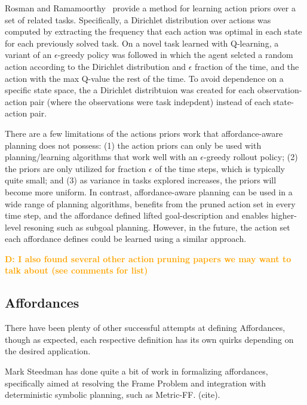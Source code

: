 \documentclass[]{article}
\newcommand{\dnote}[1]{\textcolor{Orange}{\textbf{D: #1}}}
\begin{document}
Rosman and Ramamoorthy~\cite{rosman2012good} provide a method for learning action priors over a set of related tasks. Specifically, a Dirichlet distribution over actions was computed by extracting the frequency that each action was optimal in each state for each previously solved task. On a novel task learned with Q-learning, a variant of an $\epsilon$-greedy policy was followed in which the agent selcted a random action according to the Dirichlet distribution and $\epsilon$ fraction of the time, and the action with the max Q-value the rest of the time. To avoid dependence on a specific state space, the a Dirichlet distribtuion was created for each observation-action pair (where the observations were task indepdent) instead of each state-action pair.

There are a few limitations of the actions priors work that affordance-aware planning does not possess: (1) the action priors can only be used with planning/learning algorithms that work well with an $\epsilon$-greedy rollout policy; (2) the priors are only utilized for fraction $\epsilon$ of the time steps, which is typically quite small; and (3) as variance in tasks explored increases, the priors will become more uniform. In contrast, affordance-aware planning can be used in a wide range of planning algorithms, benefits from the pruned action set in every time step, and the affordance defined lifted goal-description and enables higher-level resoning such as subgoal planning. However, in the future, the action set each affordance defines could be learned using a similar approach.

\dnote{I also found several other action pruning papers we may want to talk about (see comments for list)}


\subsection{Affordances}
There have been plenty of other successful attempts at defining Affordances, though as expected, each respective definition
has its own quirks depending on the desired application.

Mark Steedman has done quite a bit of work in formalizing affordances, specifically aimed at resolving the Frame Problem and integration with deterministic symbolic planning, such as Metric-FF. (cite).
\end{document}

